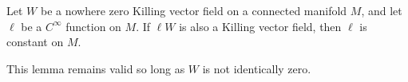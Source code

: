 Let $W$ be a nowhere zero Killing vector field on a connected manifold $M$, and let $\ell$ be a $C^\infty$ function on $M$. If $\ell W$ is also a Killing vector field, then $\ell$ is constant on $M$.

This lemma remains valid so long as $W$ is not identically zero.
